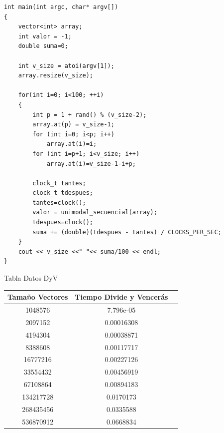 \documentclass[12pt]{beamer}
\begin{document}
\begin{frame}[fragile]
	\begin{lstlisting}
int main(int argc, char* argv[])
{
	vector<int> array;
  	int valor = -1;
	double suma=0;

  	int v_size = atoi(argv[1]);
  	array.resize(v_size);

	for(int i=0; i<100; ++i)
	{
		int p = 1 + rand() % (v_size-2);
  		array.at(p) = v_size-1;
  		for (int i=0; i<p; i++)
  			array.at(i)=i;
  		for (int i=p+1; i<v_size; i++)
  			array.at(i)=v_size-1-i+p;

  		clock_t tantes;
  		clock_t tdespues;
  		tantes=clock();
  		valor = unimodal_secuencial(array);
  		tdespues=clock();
		suma += (double)(tdespues - tantes) / CLOCKS_PER_SEC;
	}
  	cout << v_size <<" "<< suma/100 << endl;
}
	\end{lstlisting}

\end{frame}

\begin{frame}{Tabla Datos DyV}
\begin{tabular}{|c|c|c|}
\hline 
Tamaño Vectores & Tiempo Divide y Vencerás \\ 
\hline 
1048576 & 7.796e-05 \\ 
\hline 
2097152 & 0.00016308  \\ 
\hline 
4194304 & 0.00038871  \\ 
\hline 
8388608 & 0.00117717  \\ 
\hline 
16777216 & 0.00227126  \\ 
\hline 
33554432 & 0.00456919  \\ 
\hline 
67108864 & 0.00894183  \\ 
\hline 
134217728 & 0.0170173  \\ 
\hline 
268435456 & 0.0335588 \\ 
\hline 
536870912 & 0.0668834 \\ 
\hline 
\end{tabular} 

\end{frame}
\end{document}
